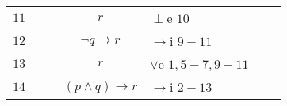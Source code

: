\documentclass[12pt]{article}
\begin{document}
\begin{table}[H]
\begin{tabular}{lllclll}
	    $11$ &\multicolumn{1}{|c}{}  & \multicolumn{1}{|c}{} & \multicolumn{1}{|c}{$r$} & \multicolumn{1}{l|}{$\perp$e $10$} & \multicolumn{1}{l|}{} & \multicolumn{1}{c|}{} \\ \cline{4-5}
	    
	    $12$ &\multicolumn{1}{|c}{}  & \multicolumn{1}{|c}{} & $\neg q \rightarrow r$ &$\rightarrow$i $9-11$ & \multicolumn{1}{l|}{} & \multicolumn{1}{c|}{} \\ \cline{3-6}
	    
	    $13$ &\multicolumn{1}{|c}{}  &  & $r$ &$\lor$e $1,5-7,9-11$ &  & \multicolumn{1}{c|}{} \\ \cline{2-7}
	    
	    $14$ & & & $(p \land q) \rightarrow r$ & $\rightarrow$i $2-13$  & &\\ 
	
	\end{tabular}
\end{table}
\end{document}
